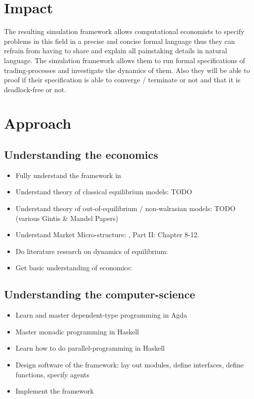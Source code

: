 \documentclass{article}
\begin{document}

\section{Impact}
The resulting simulation framework allows computational economists to specify problems in this field in a precise and concise formal language thus they can refrain from having to share and explain all painstaking details in natural language. The simulation framework allows them to run formal specifications of trading-processes and investigate the dynamics of them. Also they will be able to proof if their specification is able to converge / terminate or not and that it is deadlock-free or not.



\section{Approach}

\subsection{Understanding the economics}
\begin{itemize}
\item Fully understand the framework in \cite{Botta20114025}
\item Understand theory of classical equilibrium models: TODO
\item Understand theory of out-of-equilibrium / non-walrasian models: TODO (various Gintis \& Mandel Papers)
\item Understand Market Micro-structure: \cite{LehalleLaruelle2013}, \cite{baker_market_2013} Part II: Chapter 8-12.
\item Do literature research on dynamics of equilibrium: \cite{emergent_2008}
\item Get basic understanding of economics: \cite{bowles_understanding_2005}
\end{itemize}

\subsection{Understanding the computer-science}
\begin{itemize}
\item Learn and master  dependent-type programming in Agda
\item Master monadic programming in Haskell
\item Learn how to do parallel-programming in Haskell
\item Design software of the framework: lay out modules, define interfaces, define functions, specify agents
\item Implement the framework
\end{itemize}
\end{document}
